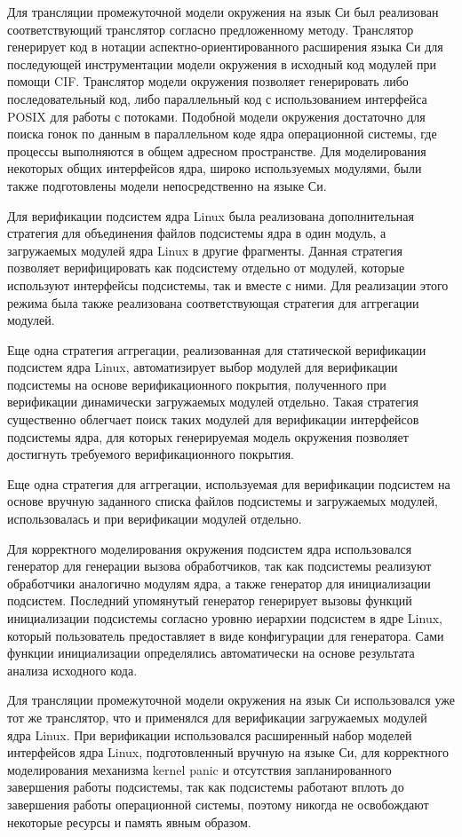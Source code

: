\documentclass[%
candidate,     %
href,        %
colorlinks,  %
]{disser}
\begin{document}
Для трансляции промежуточной модели окружения на язык Си был реализован соответствующий транслятор согласно предложенному методу.
Транслятор генерирует код в нотации аспектно-ориентированного расширения языка Си для последующей инструментации модели окружения в исходный код модулей при помощи CIF.
Транслятор модели окружения позволяет генерировать либо последовательный код, либо параллельный код с использованием интерфейса POSIX для работы с потоками.
Подобной модели окружения достаточно для поиска гонок по данным в параллельном коде ядра операционной системы, где процессы выполняются в общем адресном пространстве.
Для моделирования некоторых общих интерфейсов ядра, широко используемых модулями, были также подготовлены модели непосредственно на языке Си.

Для верификации подсистем ядра Linux была реализована дополнительная стратегия для объединения файлов подсистемы ядра в один модуль, а загружаемых модулей ядра Linux в другие фрагменты.
Данная стратегия позволяет верифицировать как подсистему отдельно от модулей, которые используют интерфейсы подсистемы, так и вместе с ними.
Для реализации этого режима была также реализована соответствующая стратегия для аггрегации модулей.

Еще одна стратегия аггрегации, реализованная для статической верификации подсистем ядра Linux, автоматизирует выбор модулей для верификации подсистемы на основе верификационного покрытия, полученного при верификации динамически загружаемых модулей отдельно.
Такая стратегия существенно облегчает поиск таких модулей для верификации интерфейсов подсистемы ядра, для которых генерируемая модель окружения позволяет достигнуть требуемого верификационного покрытия.

Еще одна стратегия для аггрегации, используемая для верификации подсистем на основе вручную заданного списка файлов подсистемы и загружаемых модулей, использовалась и при верификации модулей отдельно.

Для корректного моделирования окружения подсистем ядра использовался генератор для генерации вызова обработчиков, так как подсистемы реализуют обработчики аналогично модулям ядра, а также генератор для инициализации подсистем.
Последний упомянутый генератор генерирует вызовы функций инициализации подсистемы согласно уровню иерархии подсистем в ядре Linux, который пользователь предоставляет в виде конфигурации для генератора.
Сами функции инициализации определялись автоматически на основе результата анализа исходного кода.

Для трансляции промежуточной модели окружения на язык Си использовался уже тот же  транслятор, что и применялся для верификации загружаемых модулей ядра Linux.
При верификации использовался расширенный набор моделей интерфейсов ядра Linux, подготовленный вручную на языке Си, для корректного моделирования механизма kernel panic и отсутствия запланированного завершения работы подсистемы, так как подсистемы работают вплоть до завершения работы операционной системы, поэтому никогда не освобождают некоторые ресурсы и память явным образом.
\end{document}

